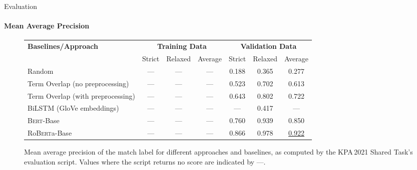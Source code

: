 \documentclass[english,handout]{mlutalk}
\newcommand{\Bert}{\textsc{Bert}\xspace}
\newcommand{\BertBase}{\Bert-Base\xspace}
\newcommand{\Roberta}{\mbox{Ro\textsc{Bert}a}\xspace}
\newcommand{\RobertaBase}{\Roberta-Base\xspace}
\begin{document}
\begin{frame}{Evaluation}
  \framesubtitle{Mean Average Precision}
  \begin{figure}
    \centering
    \caption{Mean average precision of the match label for different approaches and baselines, as computed by the KPA\,2021 Shared Task's evaluation script.
    Values where the script returns no score are indicated by ---.}
    \tiny
    \begin{tabular}{lcccccc}
      \toprule
      \textbf{Baselines/Approach} & \multicolumn{3}{c}{\textbf{Training Data}} & \multicolumn{3}{c}{\textbf{Validation Data}}\\
      \cmidrule(r{0.5em}){2-4} \cmidrule(l{0.5em}){5-7}
      & Strict & Relaxed & Average & Strict & Relaxed & Average\\
      \midrule
      Random 
      & --- & --- & --- & 0.188 & 0.365 & 0.277 \\
      Term Overlap (no preprocessing)
      & --- & --- & --- & 0.523 & 0.702 & 0.613 \\
      Term Overlap (with preprocessing)
      & --- & --- & --- & 0.643 & 0.802 & 0.722 \\
      \midrule
      BiLSTM (GloVe embeddings)
      & --- & --- & --- & --- & 0.417 & --- \\
      \BertBase
      & --- & --- & --- & 0.760 & 0.939 & 0.850 \\
      \RobertaBase
      & --- & --- & --- & 0.866 & 0.978 & \underline{0.922} \\
      \bottomrule
    \end{tabular}
  \end{figure}
\end{frame}
\end{document}
